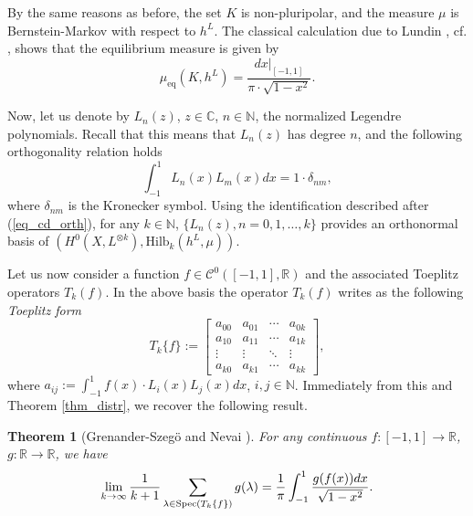 \documentclass[12pt]{article}
\numberwithin{equation}{section}
\theoremstyle{theorem}
\newtheorem{thm}{Theorem}[section]
\theoremstyle{definition}
\theoremstyle{remark}
\newcommand{\comp}{\mathbb{C}}
\newcommand{\real}{\mathbb{R}}
\newcommand{\nat}{\mathbb{N}}
\newcommand{\ccal}{\mathscr{C}}
\begin{document}
	By the same reasons as before, the set $K$ is non-pluripolar, and the measure $\mu$ is Bernstein-Markov with respect to $h^L$.
	The classical calculation due to Lundin \cite{Lundin}, cf. \cite[p. 707]{BedfordTaylorEquil}, shows that the equilibrium measure is given by
	\begin{equation}
		\mu_{\mathrm{eq}}(K, h^L) = \frac{dx|_{[-1, 1]}}{\pi \cdot \sqrt{1 - x^2}}.
	\end{equation}
	\par 
	\begin{sloppypar}
	Now, let us denote by $L_n(z)$, $z \in \comp$, $n \in \nat$, the normalized Legendre polynomials.
	Recall that this means that $L_n(z)$ has degree $n$, and the following orthogonality relation holds
	\begin{equation}\label{eq_orth_poly}
		\int_{-1}^{1} L_n(x) L_m(x) dx = 1 \cdot \delta_{n m},
	\end{equation}
	where $\delta_{n m}$ is the Kronecker symbol.
	Using the identification described after (\ref{eq_cd_orth}), for any $k \in \nat$, $\{ L_n(z), n = 0, 1, \ldots, k \}$ provides an orthonormal basis of $(H^0(X, L^{\otimes k}), {\textrm{Hilb}}_k(h^L, \mu))$.
	\end{sloppypar}
	\par 
	Let us now consider a function $f \in \ccal^0([-1, 1], \real)$ and the associated Toeplitz operators $T_k(f)$.
	In the above basis the operator $T_k(f)$ writes as the following \textit{Toeplitz form} 
	\begin{equation}
		T_k\{ f \}
		:=
		\begin{bmatrix}
		a_{0 0} & a_{0 1} & \cdots & a_{0 k} \\
		a_{1 0} & a_{1 1} & \cdots & a_{1 k} \\
		\vdots & \vdots & \ddots & \vdots \\
		a_{k 0} & a_{k 1} & \cdots & a_{k k}
		\end{bmatrix},
	\end{equation}
	where $a_{i j} := \int_{-1}^{1} f(x) \cdot L_i(x) L_j(x) dx$, $i, j \in \nat$.
	Immediately from this and Theorem \ref{thm_distr}, we recover the following result.
	\begin{thm}[{Grenander-Szeg{\"o} \cite[p. 116]{GrenanSzego} and Nevai \cite[\S 5]{Nevai}}]
		For any continuous $f : [-1, 1] \to \real$, $g: \real \to \real$, we have
		\begin{equation}
			\lim_{k \to \infty} \frac{1}{k + 1} \sum_{\lambda \in {\rm{Spec}} (T_k\{ f \})} g(\lambda)
			=
			\frac{1}{\pi}
			\int_{-1}^{1} \frac{g(f(x)) dx}{\sqrt{1 - x^2}}.
		\end{equation}
	\end{thm}
\end{document}
